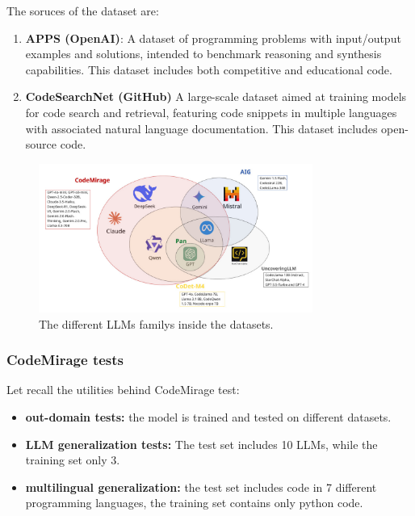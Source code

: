 The soruces of the dataset are:
\begin{enumerate}
    \item \textbf{APPS (OpenAI)}: A dataset of programming 
    problems with input/output examples and solutions, intended to 
    benchmark reasoning and synthesis capabilities. This dataset includes both competitive and educational code.
    \item \textbf{CodeSearchNet (GitHub)} A large-scale dataset aimed at training models for code 
    search and retrieval, featuring code snippets in multiple languages 
    with associated natural language documentation. This dataset includes open-source code.
\end{enumerate}


\begin{figure}[H]
    \centering
    \includegraphics[width=0.8\textwidth]{img/1/Untitled-7.pdf}
    \caption{The different LLMs familys inside the datasets.}
    \label{fig:LLMOverDataset}
\end{figure}


\subsubsection{CodeMirage tests}

Let recall the utilities behind CodeMirage \cite{guo2025codemirage} test:
\begin{itemize}
\item \textbf{out-domain tests:} the model is trained and tested on different datasets.
\item \textbf{LLM generalization tests:} The test set includes 10 LLMs, while the training set only 3.
\item \textbf{multilingual generalization:} the test set includes code in 7 different programming languages, 
the training set contains only python code.
\end{itemize}




